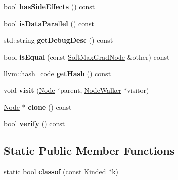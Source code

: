 \begin{DoxyCompactItemize}
bool {\bfseries has\+Side\+Effects} () const
\item 
\mbox{\label{classglow_1_1_soft_max_grad_node_a856b4f4d924af6905d629cc19146de5c}} 
bool {\bfseries is\+Data\+Parallel} () const
\item 
\mbox{\label{classglow_1_1_soft_max_grad_node_a2b952214393cdddca874904737a8cc22}} 
std\+::string {\bfseries get\+Debug\+Desc} () const
\item 
\mbox{\label{classglow_1_1_soft_max_grad_node_a5acf10b55a08fd4cb802e537d744088b}} 
bool {\bfseries is\+Equal} (const \hyperlink{classglow_1_1_soft_max_grad_node}{Soft\+Max\+Grad\+Node} \&other) const
\item 
\mbox{\label{classglow_1_1_soft_max_grad_node_a63f39f744f6928179c3f7998cc512616}} 
llvm\+::hash\+\_\+code {\bfseries get\+Hash} () const
\item 
\mbox{\label{classglow_1_1_soft_max_grad_node_a38de560c31dc7521d6f38c2a58b1121e}} 
void {\bfseries visit} (\hyperlink{classglow_1_1_node}{Node} $\ast$parent, \hyperlink{classglow_1_1_node_walker}{Node\+Walker} $\ast$visitor)
\item 
\mbox{\label{classglow_1_1_soft_max_grad_node_a5c3d7bb7205a95a54f74c578f8e75ed3}} 
\hyperlink{classglow_1_1_node}{Node} $\ast$ {\bfseries clone} () const
\item 
\mbox{\label{classglow_1_1_soft_max_grad_node_a63572ff64c26c34a0337e856dee70c3d}} 
bool {\bfseries verify} () const
\end{DoxyCompactItemize}
\subsection*{Static Public Member Functions}
\begin{DoxyCompactItemize}
\item 
\mbox{\label{classglow_1_1_soft_max_grad_node_a28cf148eb9b7b2b7c19905b58d255ac2}} 
static bool {\bfseries classof} (const \hyperlink{classglow_1_1_kinded}{Kinded} $\ast$k)
\end{DoxyCompactItemize}
